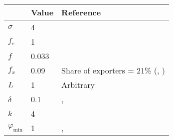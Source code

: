 \begin{tabular}{lll}
& Value & Reference\\
\hline
$\sigma$ & 4 & \cite{Irrazabal_2015}\\
$f_e$ & 1 & \cite{ghironi}\\
$f$ & 0.033 & \cite{ghironi} \\
$f_x$ & 0.09 & Share of exporters = 21\% (\cite{ghironi}, \cite{Irrazabal_2015}) \\
$L$ & 1 & Arbitrary\\
$\delta$ & 0.1 & \cite{ghironi}, \cite{Irrazabal_2015}\\
$k$ & 4 \\
$\varphi_{\text{min}}$ & 1 & \cite{ghironi}, \cite{Irrazabal_2015}\\
\hline
\end{tabular} 